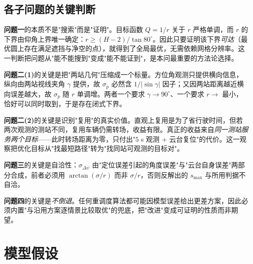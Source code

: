 \documentclass[UTF8,a4paper,zihao=-4,oneside]{ctexart}
\begin{document}
\subsection{各子问题的关键判断}

\textbf{问题一}的本质不是"搜索"而是"证明"。目标函数 $Q=1/r$ 关于 $r$ 严格单调，而 $r$ 的下界由仰角上界唯一确定：$r\ge(H-2)/\tan 80^\circ$。因此只要证明该下界\emph{可达}（最优圆上存在满足遮挡与净空的点），就得到了全局最优，无需依赖网格分辨率。这一判断把问题从"能不能搜到"变成"能不能证到"，是本问最重要的方法论选择。

\textbf{问题二(1)}的关键是把"两站几何"压缩成一个标量。方位角观测只提供横向信息，纵向由两站视线夹角 $\gamma$ 提供，故 $\sigma_p$ 必然含 $1/|\sin\gamma|$ 因子；又因两站距离越近横向误差越大，故 $\sigma_p$ 随 $r$ 单调增。两者一个要求 $\gamma\to90^\circ$、一个要求 $r\to$ 最小，恰好可以同时取到，于是存在闭式下界。

\textbf{问题二(2)}的关键是识别"复用"的真实价值。直观上复用是为了省行驶时间，但若两次观测的测站不同，复用车辆仍需转场，收益有限。真正的收益来自\emph{同一测站服务两个目标}——此时转场距离为零，只付出"$5$ s 观测 + 云台复位"的代价。这一观察把优化目标从"找最短路径"转为"找同站可观测的目标对"。

\textbf{问题三}的关键是自洽性：$\sigma_{\Delta\psi}$ 由"定位误差引起的角度误差"与"云台自身误差"两部分合成，前者必须用 $\arctan(\sigma/r)$ 而非 $\sigma/r$，否则反解出的 $s_{\max}$ 与所用判据不自洽。

\textbf{问题四}的关键是\emph{不倒退}。任何重调度算法都可能因模型误差给出更差方案，因此必须内置"与沿用方案逐情景比较取优"的兜底，把"改进"变成可证明的性质而非期望。

\section{模型假设}
\end{document}
